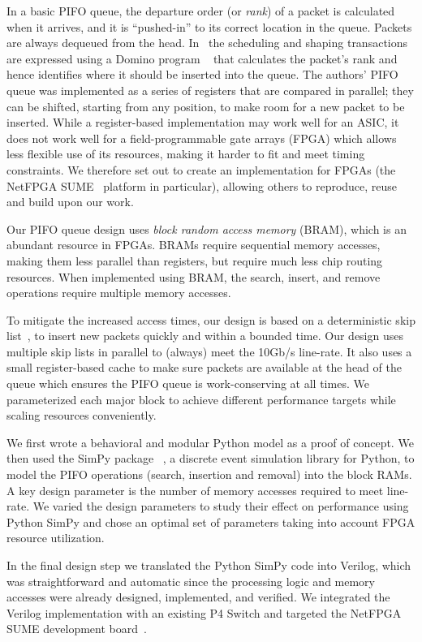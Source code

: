 In a basic PIFO queue, the departure order (or {\em rank}) of a packet is calculated when it arrives, and it is ``pushed-in'' to its  correct location in the queue. Packets are always dequeued from the head. In~\cite{pifo2016} the scheduling and shaping transactions are expressed using a Domino program ~\cite{domino:2015} that calculates the packet's rank and hence identifies where it should be inserted into the queue. The authors' PIFO queue was implemented as a series of registers that are compared in parallel; they can be shifted, starting from any position, to make room for a new packet to be inserted.  While a register-based implementation may work well for an ASIC, it does not work well for a field-programmable gate arrays (FPGA) which allows less flexible use of its resources, making it harder to fit and meet timing constraints. We therefore set out to create an implementation for FPGAs (the NetFPGA SUME~\cite{SUME} platform in particular), allowing others to reproduce, reuse and build upon our work. 

Our PIFO queue design uses {\em block random access memory} (BRAM), which is an abundant resource in FPGAs.  BRAMs require sequential memory accesses, making them less parallel than registers, but require much less chip routing resources.   When implemented using BRAM, the search, insert, and remove operations require multiple memory accesses. 

To mitigate the increased access times, our design is based on a deterministic skip list~\cite{det-skip-list}, to insert new packets quickly and within a bounded time. Our design uses multiple skip lists in parallel to (always) meet the 10Gb/s line-rate. It also uses a small register-based cache to make sure packets are available at the head of the queue which ensures the PIFO queue is work-conserving at all times. We parameterized each major block to achieve different performance targets while scaling resources conveniently.

We first wrote a behavioral and modular Python model as a proof of concept.  We then used the SimPy package ~\cite{SimPy}, a discrete event simulation library for Python, to model the PIFO operations (search, insertion and removal) into the block RAMs. A key design parameter is the number of memory accesses required to meet line-rate. We varied the design parameters to study their effect on performance using Python SimPy and chose an optimal set of parameters taking into account FPGA resource utilization.  

In the final design step we translated the Python SimPy code into Verilog, which was straightforward and automatic since the processing logic and memory accesses were already designed, implemented, and verified.  We integrated the Verilog implementation with an existing P4 Switch and targeted the NetFPGA SUME development board~\cite{SUME}. 

